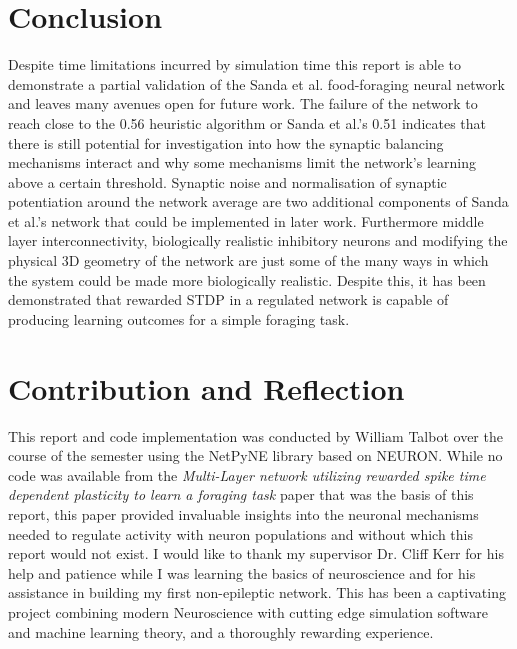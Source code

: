 \documentclass[11pt, twocolumn]{article}
\begin{document}
\section*{Conclusion}
Despite time limitations incurred by simulation time this report is able to demonstrate a partial validation of the Sanda et al. \cite{sanda2017multi} food-foraging neural network and leaves many avenues open for future work. The failure of the network to reach close to the 0.56 heuristic algorithm or Sanda et al.'s 0.51 indicates that there is still potential for investigation into how the synaptic balancing mechanisms interact and why some mechanisms limit the network's learning above a certain threshold. Synaptic noise and normalisation of synaptic potentiation around the network average are two additional components of Sanda et al.'s network that could be implemented in later work. Furthermore middle layer interconnectivity, biologically realistic inhibitory neurons and modifying the physical 3D geometry of the network are just some of the many ways in which the system could be made more biologically realistic. Despite this, it has been demonstrated that rewarded \acs{STDP} in a regulated network is capable of producing learning outcomes for a simple foraging task.

\printbibliography{}

\newpage
\section*{Contribution and Reflection}
This report and code implementation was conducted by William Talbot over the course of the semester using the \acs{NetPyNE} library based on \acs{NEURON}. While no code was available from the \textit{Multi-Layer network utilizing rewarded spike time dependent plasticity to learn a foraging task} paper \cite{sanda2017multi} that was the basis of this report, this paper provided invaluable insights into the neuronal mechanisms needed to regulate activity with neuron populations and without which this report would not exist. I would like to thank my supervisor Dr. Cliff Kerr for his help and patience while I was learning the basics of neuroscience \cite{gerstner2014neuronal} and for his assistance in building my first non-epileptic network. This has been a captivating project combining modern Neuroscience with cutting edge simulation software and machine learning theory, and a thoroughly rewarding experience.

\printacronyms[name=Acronyms]
\end{document}
